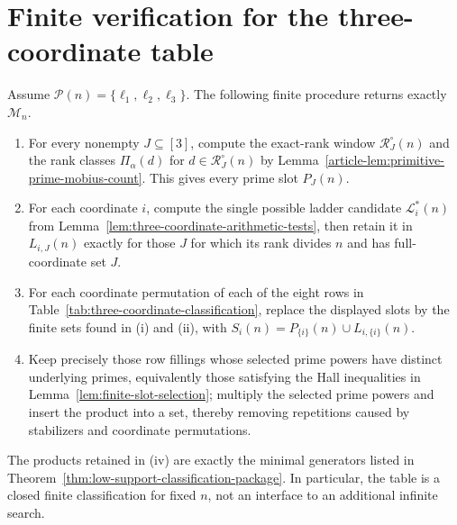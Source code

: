 \section{Finite verification for the three-coordinate table}
\label{app:three-coordinate-checklist}

\begin{proposition}
\label{prop:three-coordinate-table-checklist}
Assume $\mathcal P(n)=\{\ell_1,
\ell_2,\ell_3\}$.  The following finite procedure returns exactly
$\mathcal M_n$.
\begin{enumerate}[label=(\roman*)]
\item For every nonempty $J\subseteq[3]$, compute the exact-rank window
$\mathcal R_J^\circ(n)$ and the rank classes
$\Pi_\alpha(d)$ for $d\in\mathcal R_J^\circ(n)$ by
Lemma~\ref{article-lem:primitive-prime-mobius-count}. This gives every prime
slot $P_J(n)$.
\item For each coordinate $i$, compute the single possible ladder candidate
$\mathcal L_i^*(n)$ from
Lemma~\ref{lem:three-coordinate-arithmetic-tests}, then retain it in
$L_{i,J}(n)$ exactly for those $J$ for which its rank divides $n$ and has
full-coordinate set $J$.
\item For each coordinate permutation of each of the eight rows in
Table~\ref{tab:three-coordinate-classification}, replace the displayed slots
by the finite sets found in (i) and (ii), with
$S_i(n)=P_{\{i\}}(n)\cup L_{i,\{i\}}(n)$.
\item Keep precisely those row fillings whose selected prime powers have
distinct underlying primes, equivalently those satisfying the Hall
inequalities in Lemma~\ref{lem:finite-slot-selection}; multiply the selected
prime powers and insert the product into a set, thereby removing repetitions
caused by stabilizers and coordinate permutations.
\end{enumerate}
The products retained in (iv) are exactly the minimal generators listed in
Theorem~\ref{thm:low-support-classification-package}.  In particular, the
table is a closed finite classification for fixed $n$, not an interface to an
additional infinite search.
\end{proposition}

